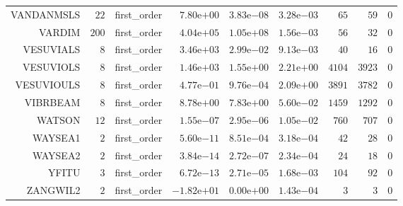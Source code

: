 \begin{longtable}{rrrrrrrrr}
VANDANMSLS & \(    22\) & first\_order & \( 7.80\)e\(+00\) & \( 3.83\)e\(-08\) & \( 3.28\)e\(-03\) & \(    65\) & \(    59\) & \(     0\) \\
VARDIM & \(   200\) & first\_order & \( 4.04\)e\(+05\) & \( 1.05\)e\(+08\) & \( 1.56\)e\(-03\) & \(    56\) & \(    32\) & \(     0\) \\
VESUVIALS & \(     8\) & first\_order & \( 3.46\)e\(+03\) & \( 2.99\)e\(-02\) & \( 9.13\)e\(-03\) & \(    40\) & \(    16\) & \(     0\) \\
VESUVIOLS & \(     8\) & first\_order & \( 1.46\)e\(+03\) & \( 1.55\)e\(+00\) & \( 2.21\)e\(+00\) & \(  4104\) & \(  3923\) & \(     0\) \\
VESUVIOULS & \(     8\) & first\_order & \( 4.77\)e\(-01\) & \( 9.76\)e\(-04\) & \( 2.09\)e\(+00\) & \(  3891\) & \(  3782\) & \(     0\) \\
VIBRBEAM & \(     8\) & first\_order & \( 8.78\)e\(+00\) & \( 7.83\)e\(+00\) & \( 5.60\)e\(-02\) & \(  1459\) & \(  1292\) & \(     0\) \\
WATSON & \(    12\) & first\_order & \( 1.55\)e\(-07\) & \( 2.95\)e\(-06\) & \( 1.05\)e\(-02\) & \(   760\) & \(   707\) & \(     0\) \\
WAYSEA1 & \(     2\) & first\_order & \( 5.60\)e\(-11\) & \( 8.51\)e\(-04\) & \( 3.18\)e\(-04\) & \(    42\) & \(    28\) & \(     0\) \\
WAYSEA2 & \(     2\) & first\_order & \( 3.84\)e\(-14\) & \( 2.72\)e\(-07\) & \( 2.34\)e\(-04\) & \(    24\) & \(    18\) & \(     0\) \\
YFITU & \(     3\) & first\_order & \( 6.72\)e\(-13\) & \( 2.71\)e\(-05\) & \( 1.68\)e\(-03\) & \(   104\) & \(    92\) & \(     0\) \\
ZANGWIL2 & \(     2\) & first\_order & \(-1.82\)e\(+01\) & \( 0.00\)e\(+00\) & \( 1.43\)e\(-04\) & \(     3\) & \(     3\) & \(     0\) \\\hline
\end{longtable}
